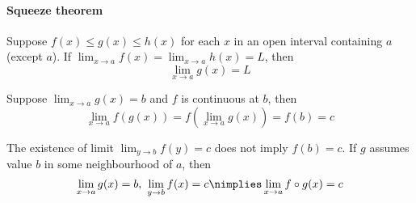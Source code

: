 \paragraph{Squeeze theorem}
	Suppose $f(x) \le g(x) \le h(x)$ for each $x$ in an open interval containing $a$ (except $a$).
	If $\displaystyle \lim_{x \to a} f(x) = \lim_{x \to a} h(x) = L$,  then
	\begin{equation}
		\lim_{x \to a} g(x) = L
		\label{equ:lim_squeeze}
	\end{equation}

\begin{theorem}
	Suppose $\displaystyle \lim_{x \to a} g(x) = b$ and $f$ is continuous at $b$, then
	\begin{equation}
		\lim_{x \to a} f(g(x)) = f(\lim_{x \to a} g(x)) = f(b) = c
	\end{equation}
\end{theorem}

\begin{remark}
	The existence of limit $\displaystyle \lim_{y \to b} f(y) = c$ does not imply $f(b) = c$.
	If $g$ assumes value $b$ in some neighbourhood of $a$, then
	\[ \lim_{x \to a} g(x) = b,\ \lim_{y \to b} f(x) = c \nimplies \lim_{x \to a} f \circ g(x) = c \]
\end{remark}

